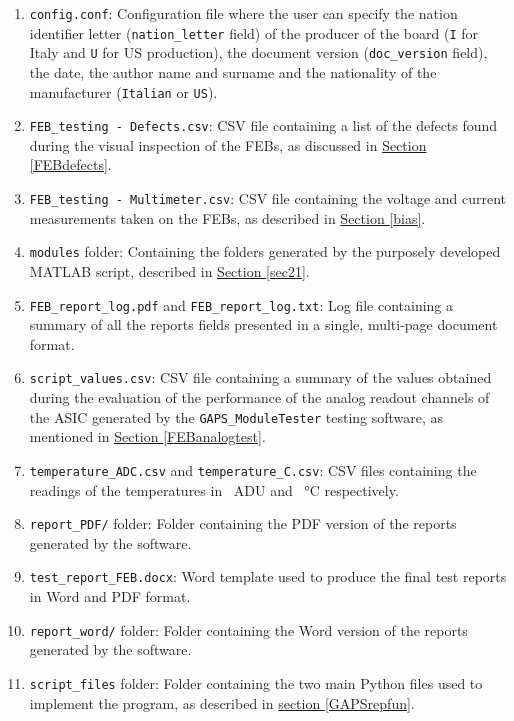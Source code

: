 \begin{enumerate}
    \itemsep0em
    \item \texttt{config.conf}: Configuration file where the user can specify the nation identifier letter (\texttt{nation\_letter} field) of the producer of the board (\texttt{I} for Italy and \texttt{U} for US production), the document version (\texttt{doc\_version} field), the date, the author name and surname and the nationality of the manufacturer (\texttt{Italian} or \texttt{US}). 
    \item \texttt{FEB\_testing - Defects.csv}: CSV file containing a list of the defects found during the visual inspection of the FEBs, as discussed in \hyperref[FEBdefects]{Section \ref{FEBdefects}}.
    \item \texttt{FEB\_testing - Multimeter.csv}: CSV file containing the voltage and current measurements taken on the FEBs, as described in \hyperref[bias]{Section \ref{bias}}.
    \item \texttt{modules} folder: Containing the folders generated by the purposely developed MATLAB script, described in \hyperref[sec21]{Section \ref{sec21}}.
    \item \texttt{FEB\_report\_log.pdf} and \texttt{FEB\_report\_log.txt}: Log file containing a summary of all the reports fields presented in a single, multi-page document format.
    \item \texttt{script\_values.csv}: CSV file containing a summary of the values obtained during the evaluation of the performance of the analog readout channels of the ASIC generated by the \texttt{GAPS\_ModuleTester} testing software, as mentioned in \hyperref[FEBanalogtest]{Section \ref{FEBanalogtest}}.
    \item \texttt{temperature\_ADC.csv} and \texttt{temperature\_C.csv}: CSV files containing the readings of the temperatures in \SI{}{ADU} and \SI{}{\celsius} respectively.
    \item \texttt{report\_PDF/} folder: Folder containing the PDF version of the reports generated by the software.
    \item \texttt{test\_report\_FEB.docx}: Word template used to produce the final test reports in Word and PDF format.
    \item \texttt{report\_word/} folder: Folder containing the Word version of the reports generated by the software.
    \item \texttt{script\_files} folder: Folder containing the two main Python files used to implement the program, as described in \hyperref[GAPSrepfun]{section \ref{GAPSrepfun}}.
    
\end{enumerate}

